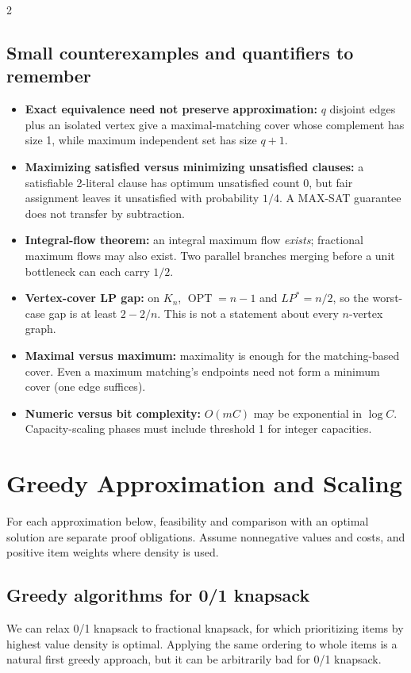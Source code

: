 \documentclass[10pt]{article}
\theoremstyle{definition}
\newcommand{\OPT}{\operatorname{OPT}}
\begin{document}
\begin{multicols*}{2}
\subsection{Small counterexamples and quantifiers to remember}
\begin{itemize}
\item \textbf{Exact equivalence need not preserve approximation:} $q$ disjoint edges plus
an isolated vertex give a maximal-matching cover whose complement has size 1, while
maximum independent set has size $q+1$.
\item \textbf{Maximizing satisfied versus minimizing unsatisfied clauses:} a satisfiable
2-literal clause has optimum unsatisfied count 0, but fair assignment leaves it unsatisfied
with probability $1/4$. A MAX-SAT guarantee does not transfer by subtraction.
\item \textbf{Integral-flow theorem:} an integral maximum flow \emph{exists}; fractional
maximum flows may also exist. Two parallel branches merging before a unit bottleneck can
each carry $1/2$.
\item \textbf{Vertex-cover LP gap:} on $K_n$, $\OPT=n-1$ and $LP^*=n/2$, so the
worst-case gap is at least $2-2/n$. This is not a statement about every $n$-vertex graph.
\item \textbf{Maximal versus maximum:} maximality is enough for the matching-based cover.
Even a maximum matching's endpoints need not form a minimum cover (one edge suffices).
\item \textbf{Numeric versus bit complexity:} $O(mC)$ may be exponential in $\log C$.
Capacity-scaling phases must include threshold 1 for integer capacities.
\end{itemize}



\clearpage\section{Greedy Approximation and Scaling}\label{gre:main}
For each approximation below, feasibility and comparison with an optimal solution are separate proof obligations. Assume nonnegative values and costs, and positive item weights where density is used.

\subsection{Greedy algorithms for 0/1 knapsack}\label{gre:knapsack}
We can relax 0/1 knapsack to fractional knapsack, for which prioritizing items by highest value density is optimal. Applying the same ordering to whole items is a natural first greedy approach, but it can be arbitrarily bad for 0/1 knapsack.


\end{multicols*}
\end{document}
